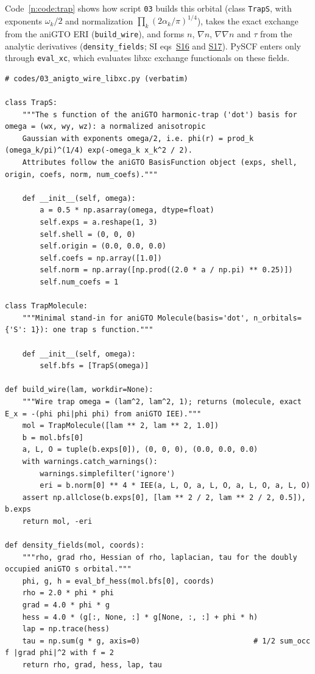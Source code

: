 \documentclass[11pt]{article}
\begin{document}
Code~\ref{n:code:trap} shows how script \texttt{03} builds this orbital (class \texttt{TrapS}, with
exponents $\omega_k/2$ and normalization $\prod_k(2\alpha_k/\pi)^{1/4}$), takes the exact exchange from the aniGTO ERI
(\texttt{build\_wire}), and forms $n$, $\nabla n$, $\nabla\nabla n$ and $\tau$ from the analytic derivatives
(\texttt{density\_fields}; SI eqs~\href{si.pdf\#equation.16}{S16} and \href{si.pdf\#equation.17}{S17}).  PySCF enters only through
\texttt{eval\_xc}, which evaluates libxc exchange functionals on these fields.

\begin{lstlisting}[caption={The analytic trap orbital and its density fields (script \texttt{03}, verbatim).},label=n:code:trap]
# codes/03_anigto_wire_libxc.py (verbatim)

class TrapS:
    """The s function of the aniGTO harmonic-trap ('dot') basis for omega = (wx, wy, wz): a normalized anisotropic
    Gaussian with exponents omega/2, i.e. phi(r) = prod_k (omega_k/pi)^(1/4) exp(-omega_k x_k^2 / 2).
    Attributes follow the aniGTO BasisFunction object (exps, shell, origin, coefs, norm, num_coefs)."""

    def __init__(self, omega):
        a = 0.5 * np.asarray(omega, dtype=float)
        self.exps = a.reshape(1, 3)
        self.shell = (0, 0, 0)
        self.origin = (0.0, 0.0, 0.0)
        self.coefs = np.array([1.0])
        self.norm = np.array([np.prod((2.0 * a / np.pi) ** 0.25)])
        self.num_coefs = 1

class TrapMolecule:
    """Minimal stand-in for aniGTO Molecule(basis='dot', n_orbitals={'S': 1}): one trap s function."""

    def __init__(self, omega):
        self.bfs = [TrapS(omega)]

def build_wire(lam, workdir=None):
    """Wire trap omega = (lam^2, lam^2, 1); returns (molecule, exact E_x = -(phi phi|phi phi) from aniGTO IEE)."""
    mol = TrapMolecule([lam ** 2, lam ** 2, 1.0])
    b = mol.bfs[0]
    a, L, O = tuple(b.exps[0]), (0, 0, 0), (0.0, 0.0, 0.0)
    with warnings.catch_warnings():
        warnings.simplefilter('ignore')
        eri = b.norm[0] ** 4 * IEE(a, L, O, a, L, O, a, L, O, a, L, O)
    assert np.allclose(b.exps[0], [lam ** 2 / 2, lam ** 2 / 2, 0.5]), b.exps
    return mol, -eri

def density_fields(mol, coords):
    """rho, grad rho, Hessian of rho, laplacian, tau for the doubly occupied aniGTO s orbital."""
    phi, g, h = eval_bf_hess(mol.bfs[0], coords)
    rho = 2.0 * phi * phi
    grad = 4.0 * phi * g
    hess = 4.0 * (g[:, None, :] * g[None, :, :] + phi * h)
    lap = np.trace(hess)
    tau = np.sum(g * g, axis=0)                          # 1/2 sum_occ f |grad phi|^2 with f = 2
    return rho, grad, hess, lap, tau
\end{lstlisting}
\end{document}
